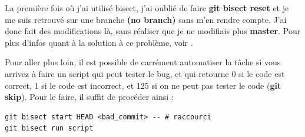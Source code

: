\documentclass[a4paper,twoside]{article}
\begin{document}
\begin{remarque}
La première fois où j'ai utilisé bisect, j'ai oublié de faire \textbf{git bisect reset} et je me suis retrouvé sur une branche \textbf{(no branch)} sans m'en rendre compte. J'ai donc fait des modifications là, sans réaliser que je ne modifiais plus \textbf{master}. Pour plus d'infos quant à la solution à ce problème, voir .
\end{remarque}

\bigskip

Pour aller plus loin, il est possible de carrément automatiser la tâche si vous arrivez à faire un script qui peut tester le bug, et qui retourne 0 si le code est correct, 1 si le code est incorrect, et 125 si on ne peut pas tester le code (\textbf{git skip}). Pour le faire, il suffit de procéder ainsi :
\begin{verbatim}
git bisect start HEAD <bad_commit> -- # raccourci
git bisect run script
\end{verbatim}
\end{document}
